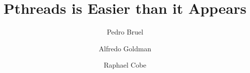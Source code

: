 


\title{Pthreads is Easier than it Appears}
\author{Pedro Bruel}
\author{Alfredo Goldman}
\author{Raphael Cobe}


\renewcommand{\shortauthors}{Bruel et al.}



\maketitle






%







